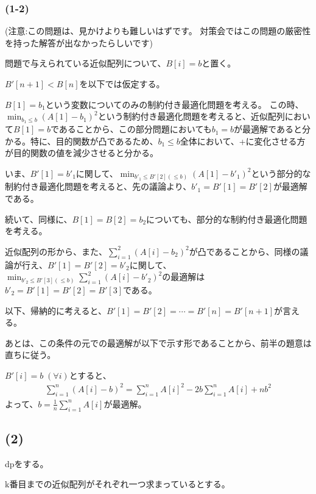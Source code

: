 \documentclass[a4paper, 10pt, dvipdfmx]{jlreq}
\begin{document}
\subsubsection*{(1-2)}

(注意:この問題は、見かけよりも難しいはずです。
対策会ではこの問題の厳密性を持った解答が出なかったらしいです)

問題で与えられている近似配列について、$B[i]=b$と置く。

$B'[n+1]<B[n]$を以下では仮定する。

$B[1]=b_1$という変数についてのみの制約付き最適化問題を考える。
この時、$\min_{b_1\leq b}(A[1]-b_1)^2$という制約付き最適化問題を考えると、近似配列において$B[1]=b$であることから、この部分問題においても$b_1=b$が最適解であると分かる。特に、目的関数が凸であるため、$b_1 \leq b$全体において、+に変化させる方が目的関数の値を減少させると分かる。

いま、$B'[1]=b'_1$に関して、$\min_{b'_1 \leq B'[2] (\leq b)}(A[1]-b'_1)^2$という部分的な制約付き最適化問題を考えると、先の議論より、$b'_1=B'[1]=B'[2]$が最適解である。

続いて、同様に、$B[1]=B[2]=b_2$についても、部分的な制約付き最適化問題を考える。

近似配列の形から、また、$\sum_{i=1}^{2}(A[i]-b_2)^2$が凸であることから、同様の議論が行え、$B'[1]=B'[2]=b'_2$に関して、$\min_{b'_2\leq B'[3](\leq b)}\sum_{i=1}^{2}(A[i]-b'_2)^2$の最適解は$b'_2=B'[1]=B'[2]=B'[3]$である。

以下、帰納的に考えると、$B'[1]=B'[2]=\cdots=B'[n]=B'[n+1]$が言える。

あとは、この条件の元での最適解が以下で示す形であることから、前半の題意は直ちに従う。

$B'[i]=b \; (\forall i)$とすると、
\begin{align*}
    \sum_{i=1}^{n}{(A[i]-b)^2} = \sum_{i=1}^{n}{A[i]^2} -2b \sum_{i=1}^{n}{A[i]} + nb^2
\end{align*}
よって、$b=\frac{1}{n}\sum_{i=1}^{n}{A[i]}$が最適解。

\subsection*{(2)}

dpをする。

k番目までの近似配列がそれぞれ一つ求まっているとする。
\end{document}

